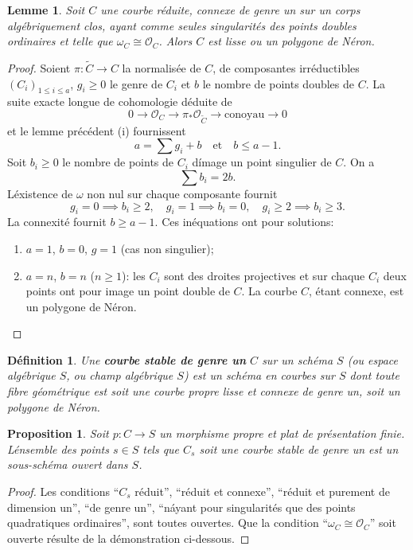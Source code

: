 \documentclass{amsart}
\theoremstyle{plain}
\newtheorem{proposition}[theorem]{Proposition}
\newtheorem{lemma}[theorem]{Lemme}
\newtheorem{definition}[theorem]{D\'efinition}
\theoremstyle{remark}
\newcommand{\cO}{\mathcal{O}}
\begin{document}
\begin{lemma}
Soit $C$ une courbe r\'eduite, connexe de genre un sur un corps alg\'ebriquement clos,
ayant comme seules singularit\'es des points doubles ordinaires et telle que
$\omega_C \cong \cO_C$. Alors $C$ est lisse ou un polygone de N\'eron.
\end{lemma}

\begin{proof}
Soient $\pi: \widetilde{C} \to C$ la normalis\'ee de $C$, de composantes irr\'eductibles
$(C_i)_{1 \leq i \leq a}$, $g_i \geq 0$ le genre de $C_i$ et $b$ le nombre de points doubles
de $C$. La suite exacte longue de cohomologie d\'eduite de
\[
0 \to \cO_C \to \pi_* \cO_{\widetilde{C}} \to \text{conoyau} \to 0
\]
et le lemme pr\'ec\'edent (i) fournissent
\[
a = \sum g_i + b \quad \text{et} \quad b \leq a - 1.
\]
Soit $b_i \geq 0$ le nombre de points de $C_i$ d\'image un point singulier de $C$. On a
\[
\sum b_i = 2b.
\]
L\'existence de $\omega$ non nul sur chaque composante fournit
\[
g_i = 0 \implies b_i \geq 2, \quad g_i = 1 \implies b_i = 0, \quad g_i \geq 2 \implies b_i \geq 3.
\]
La connexit\'e fournit $b \geq a - 1$. Ces in\'equations ont pour solutions:
\begin{enumerate}
\item[(a)] $a = 1$, $b = 0$, $g = 1$ (cas non singulier);
\item[(b)] $a = n$, $b = n$ ($n \geq 1$): les $C_i$ sont des droites projectives et sur
chaque $C_i$ deux points ont pour image un point double de $C$. La courbe $C$, \'etant
connexe, est un polygone de N\'eron.
\end{enumerate}
\end{proof}

\begin{definition}
Une \textbf{courbe stable de genre un} $C$ sur un sch\'ema $S$ (ou espace alg\'ebrique $S$,
ou champ alg\'ebrique $S$) est un sch\'ema en courbes sur $S$ dont toute fibre
g\'eom\'etrique est soit une courbe propre lisse et connexe de genre un, soit un polygone
de N\'eron.
\end{definition}

\begin{proposition}
Soit $p: C \to S$ un morphisme propre et plat de pr\'esentation finie. L\'ensemble des
points $s \in S$ tels que $C_s$ soit une courbe stable de genre un est un sous-sch\'ema
ouvert dans $S$.
\end{proposition}

\begin{proof}
Les conditions ``$C_s$ r\'eduit'', ``r\'eduit et connexe'', ``r\'eduit et purement de dimension
un'', ``de genre un'', ``n\'ayant pour singularit\'es que des points quadratiques ordinaires'',
sont toutes ouvertes. Que la condition ``$\omega_C \cong \cO_C$'' soit ouverte r\'esulte de
la d\'emonstration ci-dessous.
\end{proof}
\end{document}
